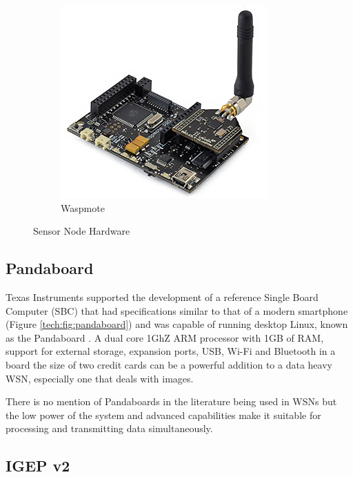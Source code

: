 \begin{figure}[ht!]
\begin{subfigure}{.5\textwidth}
		\includegraphics[width=\textwidth]{Chap3/figures/waspmote}
		\caption{Waspmote}
		\label{tech:fig:waspmote}
		\end{subfigure}
\caption{Sensor Node Hardware}
\label{tech:fig:nodes}
\end{figure}

\subsection{Pandaboard}

Texas Instruments supported the development of a reference Single Board Computer (SBC) that had specifications similar to that of a modern smartphone (Figure \ref{tech:fig:pandaboard}) and was capable of running desktop Linux, known as the Pandaboard \cite{instruments2012pandaboard}. A dual core 1GhZ ARM processor with 1GB of RAM, support for external storage, expansion ports, USB, Wi-Fi and Bluetooth in a board the size of two credit cards can be a powerful addition to a data heavy WSN, especially one that deals with images.

There is no mention of Pandaboards in the literature being used in WSNs but the low power of the system and advanced capabilities make it suitable for processing and transmitting data simultaneously. 
	
\subsection{IGEP v2}

